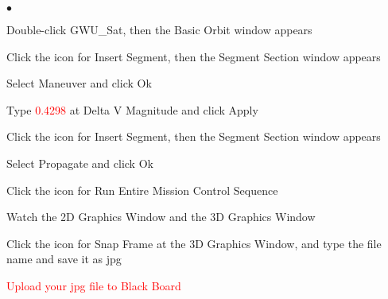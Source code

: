 \documentclass[10pt]{article}
\theoremstyle{plain}\theorembodyfont{\normalfont}
\renewcommand\emph[1]{\textsf{#1}}
\begin{document}
\begin{list}{$\bullet$}
{\setlength{\itemsep}{-3pt}\setlength{\leftmargin}{30pt}}
\item Double-click \emph{GWU\_Sat}, then the \emph{Basic Orbit} window appears
\item Click the icon for \emph{Insert Segment}, then the \emph{Segment Section} window appears
\item Select \emph{Maneuver} and click \emph{Ok}
\item Type \textcolor{red}{\emph{0.4298}} at \emph{Delta V Magnitude} and click \emph{Apply}
\item Click the icon for \emph{Insert Segment}, then the \emph{Segment Section} window appears
\item Select \emph{Propagate} and click \emph{Ok}
\item Click the icon for \emph{Run Entire Mission Control Sequence}
\item Watch the \emph{2D Graphics Window} and the \emph{3D Graphics Window}
\item Click the icon for \emph{Snap Frame} at the \emph{3D Graphics Window}, and type the file name and save it as jpg
\item \textcolor{red}{Upload your jpg file to Black Board }
\end{list}
\end{document}
